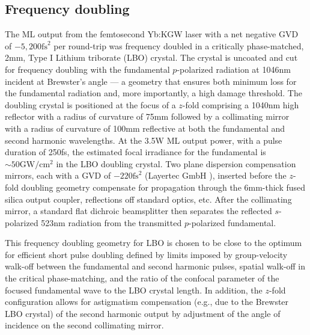 \subsection{Frequency doubling}


The ML output from the femtosecond Yb:KGW laser with a net negative GVD of $-5,200\text{fs}^2$ per round-trip was frequency doubled in a critically phase-matched, 2mm, Type I Lithium triborate (LBO) crystal.
The crystal is uncoated and cut for frequency doubling with the fundamental $p$-polarized radiation at 1046nm incident at Brewster's angle --- a geometry that ensures both minimum loss for the fundamental radiation and, more importantly, a high damage threshold.
The doubling crystal is positioned at the focus of a $z$-fold comprising a 1040nm high reflector with a radius of curvature of 75mm followed by a collimating mirror with a radius of curvature of 100mm reflective at both the fundamental and second harmonic wavelengths.
At the 3.5W ML output power, with a pulse duration of 250fs, the estimated focal irradiance for the fundamental is $\sim50\text{GW}/\text{cm}^2$ in the LBO doubling crystal.
Two plane dispersion compensation mirrors, each with a GVD of $-220\text{fs}^2$ (Layertec GmbH \cite{website_layertec}), inserted before the $z$-fold doubling geometry compensate for propagation through the 6mm-thick fused silica output coupler, reflections off standard optics, etc.
After the collimating
mirror, a standard flat dichroic beamsplitter then separates the reflected $s$-polarized 523nm radiation from the transmitted $p$-polarized fundamental.

This frequency doubling geometry for LBO is chosen to be close to the optimum for efficient short pulse doubling \cite{wang_efficiency_2003,Saltiel_second_harmonic_2004} defined by limits imposed by group-velocity walk-off between the fundamental and second harmonic pulses, spatial walk-off in the critical phase-matching, and the ratio of the confocal parameter of the focused fundamental wave to the LBO crystal length.
In addition, the $z$-fold configuration allows for astigmatism compensation (e.g., due to the Brewster LBO crystal) of the second harmonic output by adjustment of the angle of incidence on the second collimating mirror.

